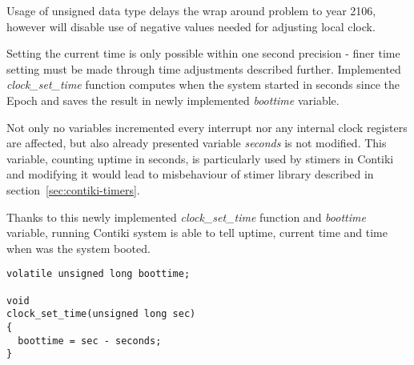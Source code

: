 Usage of unsigned data type delays the wrap around problem to year 2106,
however will disable use of negative values needed for adjusting local clock.

Setting the current time is only possible within one second precision -
finer time setting must be made through time adjustments described further.
Implemented {\it{clock\_set\_time}} function computes when the system started
in seconds since the Epoch and saves the result in newly implemented {\it{boottime}} variable.

Not only no variables incremented every interrupt nor any internal clock registers
are affected, but also already presented variable {\it{seconds}} is not modified.
This variable, counting uptime in seconds,
is particularly used by stimers in Contiki
and modifying it would lead to misbehaviour of stimer library
described in section~\ref{sec:contiki-timers}.

Thanks to this newly implemented {\it{clock\_set\_time}} function and {\it{boottime}} variable,
running Contiki system is able to tell uptime, current time and
time when was the system booted.
\begin{lstlisting}
volatile unsigned long boottime;

void
clock_set_time(unsigned long sec)
{
  boottime = sec - seconds;
}
\end{lstlisting}

